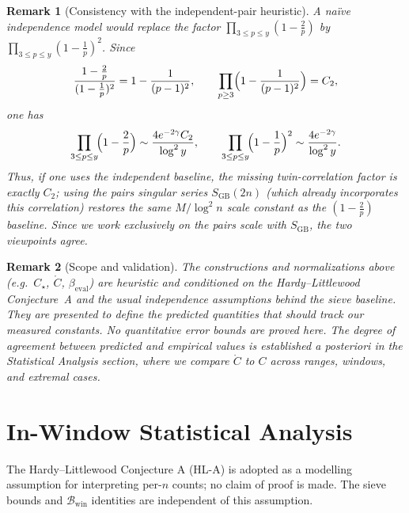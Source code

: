 \documentclass[11pt]{article}
\theoremstyle{inline}
\newtheorem*{remark}{Remark}
\theoremstyle{break}
\theoremstyle{break}
\theoremstyle{break}
\theoremstyle{break}
\theoremstyle{break}
\theoremstyle{break}
\theoremstyle{break}
\theoremstyle{inline}
\newcommand{\twin}{{\scriptscriptstyle\mathrm{win}}}
\newcommand{\Cmeas}{C}              %
\newcommand{\Cpred}{\mathring{C}}   %
\newcommand{\Bwin}{\mathcal{B}_\twin}
\newcommand{\betacal}{\beta_{\mathrm{eval}}}
\begin{document}
\begin{remark}[Consistency with the independent-pair heuristic]
A naïve independence model would replace the factor
\(\prod_{3\le p\le y}(1-\tfrac{2}{p})\) by \(\prod_{3\le p\le y}(1-\tfrac{1}{p})^2\).
Since
\begin{equation}
\frac{1-\tfrac{2}{p}}{(1-\tfrac{1}{p})^2}=1-\frac{1}{(p-1)^2},
\qquad
\prod_{p\ge3}\Bigl(1-\frac{1}{(p-1)^2}\Bigr)=C_2,
\end{equation}
one has \cite{HardyLittlewood1923, MontgomeryVaughan2007}
\begin{equation}
\prod_{3\le p\le y}\!\Bigl(1-\frac{2}{p}\Bigr)
\sim \frac{4e^{-2\gamma}C_2}{\log^2 y},
\qquad
\prod_{3\le p\le y}\!\Bigl(1-\frac{1}{p}\Bigr)^2
\sim \frac{4e^{-2\gamma}}{\log^2 y}.
\end{equation}
Thus, if one uses the independent baseline, the missing twin-correlation factor
is exactly \(C_2\); using the pairs singular series \(S_{\mathrm{GB}}(2n)\) (which
already incorporates this correlation) restores the same \(M/\log^2 n\) scale
constant as the \( (1-\tfrac{2}{p}) \) baseline. Since we work exclusively on the
pairs scale with \(S_{\mathrm{GB}}\), the two viewpoints agree.
\end{remark}

\begin{remark}[Scope and validation]
The constructions and normalizations above (e.g.\ \( C_\star \), \( \Cpred \), \( \betacal \))
are heuristic and conditioned on the Hardy–Littlewood Conjecture~A and the usual
independence assumptions behind the sieve baseline. They are presented to define
the \emph{predicted} quantities that should track our \emph{measured} constants.
No quantitative error bounds are proved here. The degree of agreement between
predicted and empirical values is established \emph{a posteriori} in the
Statistical Analysis section, where we compare \( \Cpred \) to \( \Cmeas \) across ranges,
windows, and extremal cases.
\end{remark}


\section*{In-Window Statistical Analysis}

The Hardy–Littlewood Conjecture A (HL-A) is adopted as a modelling assumption for interpreting per-\( n \) counts; no claim of proof is made. The sieve bounds and \( \Bwin \) identities are independent of this assumption.
\end{document}
